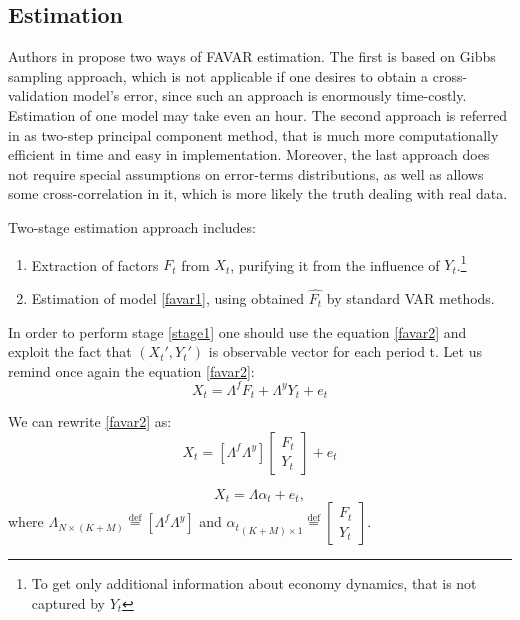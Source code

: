 \documentclass[a4paper, 14pt]{article}
\begin{document}
\subsection{Estimation}
Authors in \cite{bernanke2005measuring} propose two ways of FAVAR estimation. The first is based on Gibbs sampling approach, which is not applicable if one desires to obtain a cross-validation model's error, since such an approach is enormously time-costly. Estimation of one model may take even an hour.  The second approach is referred in \cite{bernanke2005measuring} as two-step principal component method, that is much more computationally efficient in time and easy in implementation. Moreover, the last approach does not require special assumptions on error-terms distributions, as well as allows some cross-correlation in it, which is more likely the truth dealing with real data.

Two-stage estimation approach includes:
\begin{enumerate}
	\item Extraction of factors $F_t$ from $X_t$, purifying it from the influence of $Y_t$.\footnote{To get only additional information about economy dynamics, that is not captured by $Y_t$} \label{stage1}
	\item Estimation of model \eqref{favar1}, using obtained $\hat{F_t}$ by standard VAR methods. \label{stage2}
\end{enumerate}
In order to perform stage \ref{stage1} one should use the equation \eqref{favar2} and exploit the fact that $(X_t', Y_t')$ is observable vector for each period t. Let us remind once again the equation \eqref{favar2}:
\[X_t = \Lambda^f F_t + \Lambda^y Y_t + e_t\]

We can rewrite \eqref{favar2} as: 
\begin{equation}
X_t = \left[ \Lambda^f \Lambda^y \right] \begin{bmatrix}
F_t \\
Y_t 
\end{bmatrix} + e_t
\end{equation}

\begin{equation}
X_t = \Lambda \alpha_t + e_t, 
\end{equation}
where $\Lambda_{N \times (K+M)} \stackrel{\text{def}}{=} \left[ \Lambda^f \Lambda^y \right]$ and ${\alpha_t}_{(K+M) \times 1} \stackrel{\text{def}}{=} \begin{bmatrix}
F_t \\
Y_t 
\end{bmatrix}$.
\end{document}
